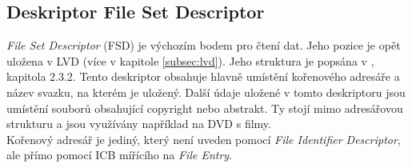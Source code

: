 \subsection{Deskriptor File Set Descriptor}
\label{subsec:fsd}
\textit{File Set Descriptor} (FSD) je výchozím bodem pro čtení dat. Jeho pozice je opět uložena v LVD (více v kapitole \ref{subsec:lvd}). Jeho struktura je popsána v \cite{osta-udf-0201}, kapitola 2.3.2. Tento deskriptor obsahuje hlavně umístění kořenového adresáře a název svazku, na kterém je uložený. Další údaje uložené v tomto deskriptoru jsou umístění souborů obsahující copyright nebo abstrakt. Ty stojí mimo adresářovou strukturu a jsou využívány například na DVD s filmy.\\
Kořenový adresář je jediný, který není uveden pomocí \textit{File Identifier Descriptor}, ale přímo pomocí ICB mířícího na \textit{File Entry}. 

